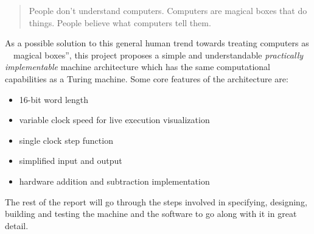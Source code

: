 \documentclass[11pt]{informatics-report}
\begin{document}
\begin{quotation}
People don't understand computers. Computers are magical boxes that do things. People believe what computers tell them. \cite{schneier2011secrets}
\end{quotation}
As a possible solution to this general human trend towards treating computers as ~~magical boxes'', this project proposes a simple and understandable \emph{practically implementable} machine architecture which has the same computational capabilities as a Turing machine. \linebreak
Some core features of the architecture are:
{\begin{itemize}
  \item 16-bit word length
  \item variable clock speed for live execution visualization
  \item single clock step function
  \item simplified input and output
  \item hardware addition and subtraction implementation
\end{itemize}}

The rest of the report will go through the steps involved in specifying, designing, building and testing the machine and the software to go along with it in great detail.
\pagebreak
\end{document}
